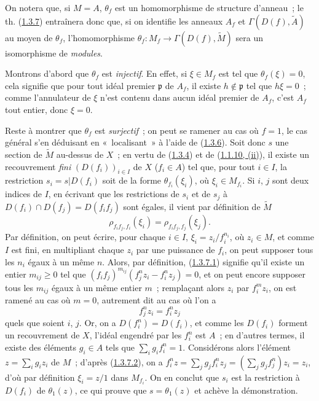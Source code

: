 On notera que, si $M=A$, $\theta_f$ est un homomorphisme de structure
d'anneau~; le th. (\hyperref[I.1.3.7-fr]{1.3.7}) entraînera donc que, si on
identifie les anneaux $A_f$ et $\Gamma(D(f),\widetilde{A})$ au moyen de
$\theta_f$, l'homomorphisme
$\theta_f:M_f\to\Gamma(D(f),\widetilde{M})$ sera un isomorphisme de
\emph{modules}.

Montrons d'abord que $\theta_f$ est \emph{injectif}. En effet, si
$\xi\in M_f$ est tel que $\theta_f(\xi)=0$, cela signifie que pour tout idéal
premier $\mathfrak{p}$ de $A_f$, il existe $h\notin\mathfrak{p}$ tel que
$h\xi=0$~; comme l'annulateur de $\xi$ n'est contenu dans aucun idéal premier
de $A_f$, c'est $A_f$ tout entier, donc $\xi=0$.

Reste à montrer que $\theta_f$ est \emph{surjectif}~; on peut se ramener au
cas où $f=1$, le cas général s'en déduisant en «~localisant~» à l'aide de
(\hyperref[I.1.3.6-fr]{1.3.6}). Soit donc $s$ une section de $\widetilde{M}$
au-dessus de $X$~; en vertu de (\hyperref[I.1.3.4-fr]{1.3.4}) et de
(\hyperref[I.1.1.10-fr]{1.1.10, (ii)}), il existe un recouvrement
\emph{fini} $(D(f_i))_{i\in I}$ de $X$ ($f_i\in A$) tel que, pour tout
$i\in I$, la restriction $s_i=s|D(f_i)$ soit de la forme
$\theta_{f_i}(\xi_i)$, où $\xi_i\in M_{f_i}$. Si $i$, $j$ sont deux indices
de $I$, en écrivant que les restrictions de $s_i$ et de $s_j$ à
$D(f_i)\cap D(f_j)=D(f_i f_j)$ sont égales, il vient par définition de
$\widetilde{M}$
\begin{equation}
  \rho_{f_i f_j,f_i}(\xi_i)=\rho_{f_i f_j,f_j}(\xi_j).
  \tag{1.3.7.1}\label{I.1.3.7.1-fr}
\end{equation}
Par définition, on peut écrire, pour chaque $i\in I$,
$\xi_i=z_i/f_i^{n_i}$, où $z_i\in M$, et comme $I$ est fini, en multipliant
chaque $z_i$ par une puissance de $f_i$, on peut supposer tous les $n_i$
égaux à un même $n$. Alors, par définition, (\hyperref[I.1.3.7.1-fr]{1.3.7.1})
signifie qu'il existe un entier $m_{ij}\geq0$ tel que
$(f_i f_j)^{m_{ij}}(f_j^n z_i-f_i^n z_j)=0$, et on peut encore supposer tous
les $m_{ij}$ égaux à un même entier $m$~; remplaçant alors $z_i$ par
$f_i^m z_i$, on est ramené au cas où $m=0$, autrement dit au cas où l'on a
\begin{equation}
  f_j^n z_i=f_i^n z_j
  \tag{1.3.7.2}\label{I.1.3.7.2-fr}
\end{equation}
quels que soient $i$, $j$. Or, on a $D(f_i^n)=D(f_i)$, et comme les $D(f_i)$
forment un recouvrement de $X$, l'idéal engendré par les $f_i^n$ est $A$~;
en d'autres termes, il existe des éléments $g_i\in A$ tels que
$\sum_i g_i f_i^n=1$. Considérons alors l'élément
$z=\sum_i g_i z_i$ de $M$~; d'après (\hyperref[I.1.3.7.2-fr]{1.3.7.2}), on a
$f_i^n z=\sum_j g_j f_i^n z_j=(\sum_j g_j f_j^n)z_i=z_i$, d'où par
définition $\xi_i=z/1$ dans $M_{f_i}$. On en conclut
que $s_i$ est la restriction à $D(f_i)$ de $\theta_1(z)$, ce qui prouve que
$s=\theta_1(z)$ et achève la démonstration.

